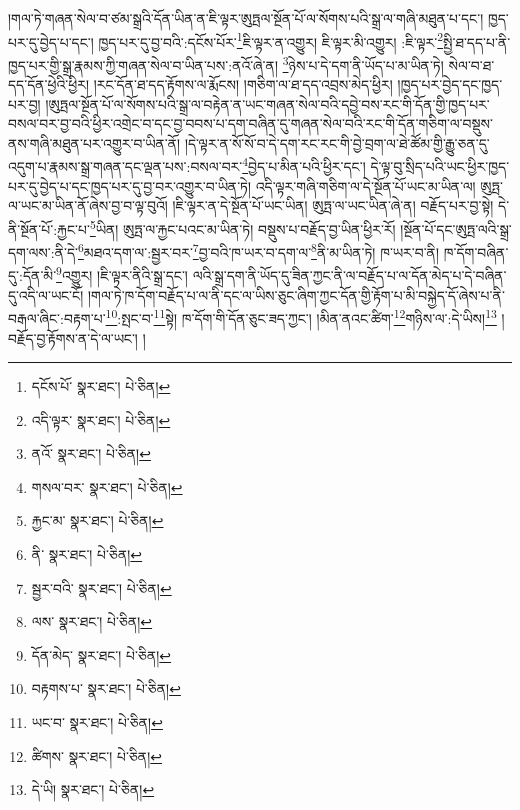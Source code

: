 །གལ་ཏེ་གཞན་སེལ་བ་ཙམ་སྒྲའི་དོན་ཡིན་ན་ཇི་ལྟར་ཨུཏྤལ་སྔོན་པོ་ལ་སོགས་པའི་སྒྲ་ལ་གཞི་མཐུན་པ་དང་། ཁྱད་པར་དུ་བྱེད་པ་དང་། ཁྱད་པར་དུ་བྱ་བའི་:དངོས་པོར་\footnote{དངོས་པོ་  སྣར་ཐང་།  པེ་ཅིན། }ཇི་ལྟར་ན་འགྱུར། ཇི་ལྟར་མི་འགྱུར། :ཇི་ལྟར་\footnote{འདི་ལྟར་  སྣར་ཐང་།  པེ་ཅིན། }སྤྱི་ཐ་དད་པ་ནི་ཁྱད་པར་གྱི་སྒྲ་རྣམས་ཀྱི་གཞན་སེལ་བ་ཡིན་པས་:ནའོ་ཞེ་ན། \footnote{ནའོ་  སྣར་ཐང་།  པེ་ཅིན། }ཉེས་པ་དེ་དག་ནི་ཡོད་པ་མ་ཡིན་ཏེ། སེལ་བ་ཐ་དད་དོན་ཕྱེའི་ཕྱིར། །རང་དོན་ཐ་དད་རྟོགས་ལ་རྨོངས། །གཅིག་ལ་ཐ་དད་འབྲས་མེད་ཕྱིར། །ཁྱད་པར་བྱེད་དང་ཁྱད་པར་བྱ། །ཨུཏྤལ་སྔོན་པོ་ལ་སོགས་པའི་སྒྲ་ལ་བརྟེན་ན་ཡང་གཞན་སེལ་བའི་དབྱེ་བས་རང་གི་དོན་གྱི་ཁྱད་པར་བསལ་བར་བྱ་བའི་ཕྱིར་འགྲེང་བ་དང་བྱ་བབས་པ་དག་བཞིན་དུ་གཞན་སེལ་བའི་རང་གི་དོན་གཅིག་ལ་བསྡུས་ནས་གཞི་མཐུན་པར་འགྱུར་བ་ཡིན་ནོ། །དེ་ལྟར་ན་སོ་སོ་བ་དེ་དག་རང་རང་གི་བྱེ་བྲག་ལ་ཐེ་ཚོམ་གྱི་རྒྱུ་ཅན་དུ་འདུག་པ་རྣམས་སྒྲ་གཞན་དང་ལྡན་པས་:བསལ་བར་\footnote{གསལ་བར་  སྣར་ཐང་།  པེ་ཅིན། }བྱེད་པ་མིན་པའི་ཕྱིར་དང་། དེ་ལྟ་བུ་སྲིད་པའི་ཡང་ཕྱིར་ཁྱད་པར་དུ་བྱེད་པ་དང་ཁྱད་པར་དུ་བྱ་བར་འགྱུར་བ་ཡིན་ཏེ། འདི་ལྟར་གཞི་གཅིག་ལ་དེ་སྔོན་པོ་ཡང་མ་ཡིན་ལ། ཨུཏྤ་ལ་ཡང་མ་ཡིན་ནོ་ཞེས་བྱ་བ་ལྟ་བུའོ། །ཇི་ལྟར་ན་དེ་སྔོན་པོ་ཡང་ཡིན། ཨུཏྤ་ལ་ཡང་ཡིན་ཞེ་ན། བརྗོད་པར་བྱ་སྟེ། དེ་ནི་སྔོན་པོ་:རྐྱང་པ་\footnote{རྐྱང་མ་  སྣར་ཐང་།  པེ་ཅིན། }ཡིན། ཨུཏྤ་ལ་རྐྱང་པའང་མ་ཡིན་ཏེ། བསྡུས་པ་བརྗོད་བྱ་ཡིན་ཕྱིར་རོ། །སྔོན་པོ་དང་ཨུཏྤ་ལའི་སྒྲ་དག་ལས་:ནི་དེ་\footnote{ནི་  སྣར་ཐང་།  པེ་ཅིན། }མཐའ་དག་ལ་:སྦྱར་བར་\footnote{སྦྱར་བའི་  སྣར་ཐང་།  པེ་ཅིན། }བྱ་བའི་ཁ་ཡར་བ་དག་ལ་\footnote{ལས་  སྣར་ཐང་།  པེ་ཅིན། }ནི་མ་ཡིན་ཏེ། ཁ་ཡར་བ་ནི། ཁ་དོག་བཞིན་དུ་:དོན་མི་\footnote{དོན་མེད་  སྣར་ཐང་།  པེ་ཅིན། }འགྱུར། །ཇི་ལྟར་ནིའི་སྒྲ་དང་། ལའི་སྒྲ་དག་ནི་ཡོད་དུ་ཟིན་ཀྱང་ནི་ལ་བརྗོད་པ་ལ་དོན་མེད་པ་དེ་བཞིན་དུ་འདི་ལ་ཡང་ངོ། །གལ་ཏེ་ཁ་དོག་བརྗོད་པ་ལ་ནི་དང་ལ་ཡིས་ཅུང་ཞིག་ཀྱང་དོན་གྱི་རྟོག་པ་མི་བསྐྱེད་དོ་ཞེས་པ་ནི་བརྒལ་ཞིང་:བརྟག་པ་\footnote{བརྟགས་པ་  སྣར་ཐང་།  པེ་ཅིན། }:སྤང་བ་\footnote{ཡང་བ་  སྣར་ཐང་།  པེ་ཅིན། }སྟེ། ཁ་དོག་གི་དོན་ཅུང་ཟད་ཀྱང་། །མིན་ནའང་ཚིག་\footnote{ཚིགས་  སྣར་ཐང་།  པེ་ཅིན། }གཉིས་ལ་:དེ་ཡིས།\footnote{དེ་ཡི།  སྣར་ཐང་།  པེ་ཅིན། } །བརྗོད་བྱ་རྟོགས་ན་དེ་ལ་ཡང་། །
